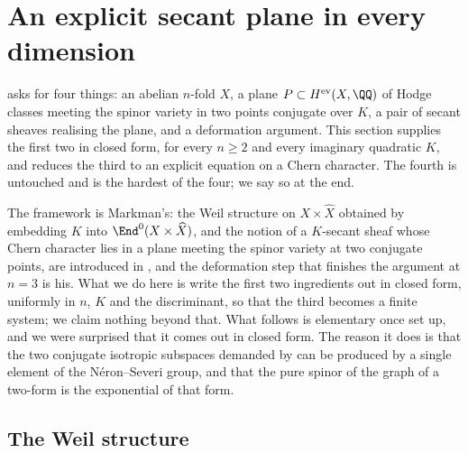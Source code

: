 \section{An explicit secant plane in every dimension}\label{sec:construction}

 asks for four things: an abelian $n$-fold $X$, a plane
$P\subset H^{\mathrm{ev}}(X,\QQ)$ of Hodge classes meeting the spinor variety
in two points conjugate over $K$, a pair of secant sheaves realising the
plane, and a deformation argument. This section supplies the first two in
closed form, for every $n\ge2$ and every imaginary quadratic $K$, and reduces
the third to an explicit equation on a Chern character. The fourth is
untouched and is the hardest of the four; we say so at the end.

The framework is Markman's: the Weil structure on $X\times\widehat{X}$
obtained by embedding $K$ into $\End^{0}(X\times\widehat{X})$, and the
notion of a $K$-secant sheaf whose Chern character lies in a plane meeting
the spinor variety at two conjugate points, are introduced in
\cite{Mar25a,Mar25b}, and the deformation step that finishes the argument
at $n=3$ is his. What we do here is write the first two ingredients out in
closed form, uniformly in $n$, $K$ and the discriminant, so that the third
becomes a finite system; we claim nothing beyond that.
What follows is elementary once set up, and we were surprised that it comes
out in closed form. The reason it does is that the two conjugate isotropic
subspaces demanded by  can be produced by a single
element of the N\'eron--Severi group, and that the pure spinor of the graph of
a two-form is the exponential of that form.

\subsection{The Weil structure}

